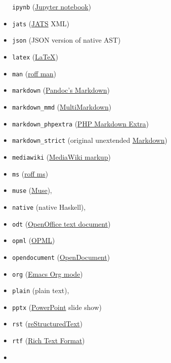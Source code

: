 \documentclass[
]{article}
\begin{document}
\begin{description}
\begin{itemize}
  \texttt{ipynb}
  (\href{https://nbformat.readthedocs.io/en/latest/}{Jupyter notebook})
\item
  \texttt{jats} (\href{https://jats.nlm.nih.gov}{JATS} XML)
\item
  \texttt{json} (JSON version of native AST)
\item
  \texttt{latex} (\href{http://latex-project.org}{LaTeX})
\item
  \texttt{man}
  (\href{http://man7.org/linux/man-pages/man7/groff_man.7.html}{roff
  man})
\item
  \texttt{markdown} (\protect\hyperlink{pandocs-markdown}{Pandoc's
  Markdown})
\item
  \texttt{markdown\_mmd}
  (\href{http://fletcherpenney.net/multimarkdown/}{MultiMarkdown})
\item
  \texttt{markdown\_phpextra}
  (\href{https://michelf.ca/projects/php-markdown/extra/}{PHP Markdown
  Extra})
\item
  \texttt{markdown\_strict} (original unextended
  \href{http://daringfireball.net/projects/markdown/}{Markdown})
\item
  \texttt{mediawiki}
  (\href{https://www.mediawiki.org/wiki/Help:Formatting}{MediaWiki
  markup})
\item
  \texttt{ms}
  (\href{http://man7.org/linux/man-pages/man7/groff_ms.7.html}{roff ms})
\item
  \texttt{muse} (\href{https://amusewiki.org/library/manual}{Muse}),
\item
  \texttt{native} (native Haskell),
\item
  \texttt{odt}
  (\href{http://en.wikipedia.org/wiki/OpenDocument}{OpenOffice text
  document})
\item
  \texttt{opml} (\href{http://dev.opml.org/spec2.html}{OPML})
\item
  \texttt{opendocument}
  (\href{http://opendocument.xml.org}{OpenDocument})
\item
  \texttt{org} (\href{http://orgmode.org}{Emacs Org mode})
\item
  \texttt{plain} (plain text),
\item
  \texttt{pptx}
  (\href{https://en.wikipedia.org/wiki/Microsoft_PowerPoint}{PowerPoint}
  slide show)
\item
  \texttt{rst}
  (\href{http://docutils.sourceforge.net/docs/ref/rst/introduction.html}{reStructuredText})
\item
  \texttt{rtf}
  (\href{http://en.wikipedia.org/wiki/Rich_Text_Format}{Rich Text
  Format})
\item

\end{itemize}
\end{description}
\end{document}
